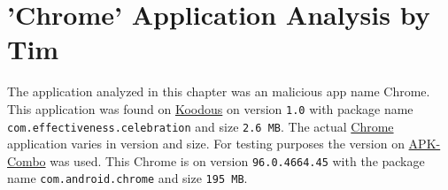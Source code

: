\section{'Chrome' Application Analysis by Tim}

The application analyzed in this chapter was an malicious app name Chrome.
This application was found on \href{https://koodous.com/apks/ef613e042afafb955baedc75033f6ff73d19a795ae7f541981dfe624bc700887}{Koodous} 
on version \texttt{1.0} with package name \texttt{com.effectiveness.celebration} and size \texttt{2.6 MB}.
The actual \href{https://play.google.com/store/apps/details?id=com.android.chrome&hl=en&gl=US}{Chrome} application varies in version and size. 
For testing purposes the version on \href{https://apkcombo.com/nl/chrome/com.android.chrome/}{APK-Combo} was used.
This Chrome is on version \texttt{96.0.4664.45} with the package name \texttt{com.android.chrome} and size \texttt{195 MB}.















